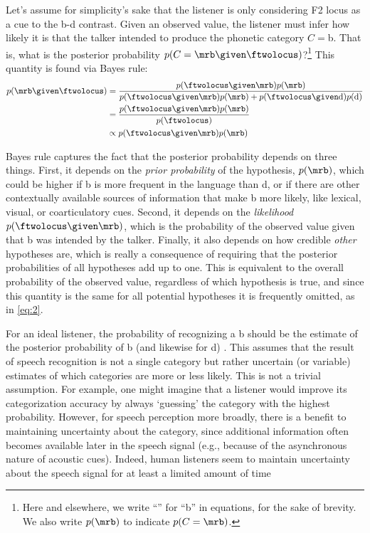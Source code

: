Let's assume for simplicity's sake that the listener is only considering F2 locus as a cue to the \ph b-\ph d contrast.  Given an observed \ftwolocus value, the listener must infer how likely it is that the talker intended to produce the phonetic category $C=$\ph b.  That is, what is the posterior probability $p(C=\mrb \given \ftwolocus)$?\footnote{Here and elsewhere, we write ``\mrb'' for ``\ph b'' in equations, for the sake of brevity.  We also write $p(\mrb)$ to indicate $p(C=\mrb)$.}  This quantity is found via Bayes rule:
\begin{align}
  \label{eq:1}
  p(\mrb \given \ftwolocus) &= \frac{p(\ftwolocus \given \mrb) p(\mrb)}{p(\ftwolocus \given \mrb) p(\mrb) + p(\ftwolocus \given \mathrm d) p(\mathrm d)} \\
  &=\frac{p(\ftwolocus \given \mrb) p(\mrb)}{p(\ftwolocus)} \\
  \label{eq:2}
  &\propto p(\ftwolocus \given \mrb) p(\mrb)
\end{align}

Bayes rule captures the fact that the posterior probability depends on three things.  First, it depends on the \emph{prior probability} of the hypothesis, $p(\mrb)$, which could be higher if \ph b is more frequent in the language than \ph d, or if there are other contextually available sources of information that make \ph b more likely, like lexical, visual, or coarticulatory cues.  Second, it depends on the \emph{likelihood} $p(\ftwolocus \given \mrb)$, which is the probability of the observed \ftwolocus value given that \ph b was intended by the talker.  Finally, it also depends on how credible \emph{other} hypotheses are, which is really a consequence of requiring that the posterior probabilities of all hypotheses add up to one.  This is equivalent to the overall probability of the observed \ftwolocus value, regardless of which hypothesis is true, and since this quantity is the same for all potential hypotheses it is frequently omitted, as in \eqref{eq:2}.

For an ideal listener, the probability of recognizing a \ph b should be the estimate of the posterior probability of \ph b (and likewise for \ph d) \cite{Clayards2008,Feldman2009a}.  This assumes that the result of speech recognition is not a single category but rather uncertain (or variable) estimates of which categories are more or less likely.  This is not a trivial assumption. For example, one might imagine that a listener would improve its categorization accuracy by always `guessing' the category with the highest probability.  However, for speech perception more broadly, there is a benefit to maintaining uncertainty about the category, since additional information often becomes available later in the speech signal (e.g., because of the asynchronous nature of acoustic cues). Indeed, human listeners seem to maintain uncertainty about the speech signal for at least a limited amount of time \autocite[cf., right-context effects in word recognition,][]{Bard1988,Connine1991,Dahan2010,Grosjean1985}


